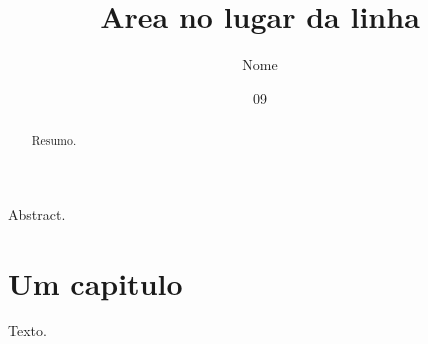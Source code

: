 \documentclass[dsc]{ufrj}
\title{Area no lugar da linha}
\author{Nome}{Sobrenome}
\date{09}{2026}
\begin{document}
  \maketitle
  \frontmatter
  \begin{abstract}Resumo.\end{abstract}
  \begin{foreignabstract}Abstract.\end{foreignabstract}
  \tableofcontents
  \mainmatter
  \chapter{Um capitulo}
  Texto.
\end{document}
